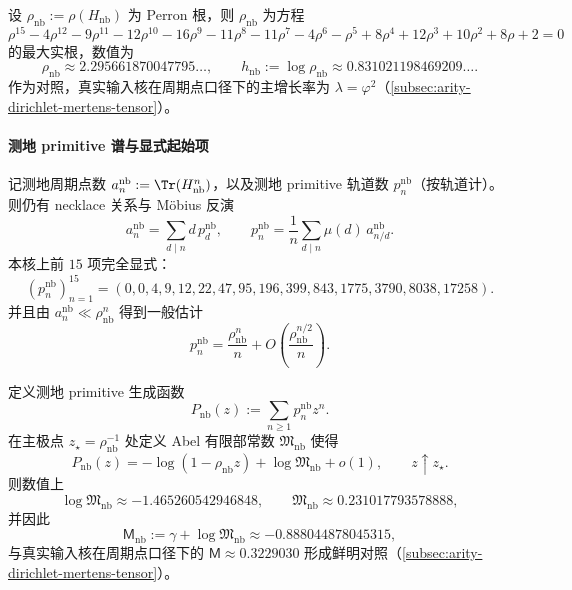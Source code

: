 \begin{corollary}[测地增长率与测地熵]\label{cor:real-input-40-geodesic-entropy}
设 \(\rho_{\mathrm{nb}}:=\rho(H_{\mathrm{nb}})\) 为 Perron 根，则 \(\rho_{\mathrm{nb}}\) 为方程
\[
\rho^{15}-4\rho^{12}-9\rho^{11}-12\rho^{10}-16\rho^{9}-11\rho^{8}-11\rho^{7}-4\rho^{6}-\rho^{5}+8\rho^{4}+12\rho^{3}+10\rho^{2}+8\rho+2=0
\]
的最大实根，数值为
\[
\rho_{\mathrm{nb}}\approx 2.295661870047795\ldots,\qquad
h_{\mathrm{nb}}:=\log\rho_{\mathrm{nb}}\approx 0.831021198469209\ldots.
\]
作为对照，真实输入核在周期点口径下的主增长率为 \(\lambda=\varphi^2\)（\ref{subsec:arity-dirichlet-mertens-tensor}）。
\end{corollary}

\paragraph{测地 primitive 谱与显式起始项}
记测地周期点数 \(a_n^{\mathrm{nb}}:=\Tr(H_{\mathrm{nb}}^n)\)，以及测地 primitive 轨道数 \(p_n^{\mathrm{nb}}\)（按轨道计）。
则仍有 necklace 关系与 Möbius 反演
\[
a_n^{\mathrm{nb}}=\sum_{d\mid n} d\,p_d^{\mathrm{nb}},
\qquad
p_n^{\mathrm{nb}}=\frac1n\sum_{d\mid n}\mu(d)\,a_{n/d}^{\mathrm{nb}}.
\]
本核上前 \(15\) 项完全显式：
\[
(p_n^{\mathrm{nb}})_{n=1}^{15}=(0,0,4,9,12,22,47,95,196,399,843,1775,3790,8038,17258).
\]
并且由 \(a_n^{\mathrm{nb}}\ll \rho_{\mathrm{nb}}^n\) 得到一般估计
\[
p_n^{\mathrm{nb}}=\frac{\rho_{\mathrm{nb}}^n}{n}+O\!\left(\frac{\rho_{\mathrm{nb}}^{n/2}}{n}\right).
\]

\begin{theorem}\label{thm:real-input-40-geodesic-mertens}
定义测地 primitive 生成函数
\[
P_{\mathrm{nb}}(z):=\sum_{n\ge 1}p_n^{\mathrm{nb}}z^n.
\]
在主极点 \(z_\star=\rho_{\mathrm{nb}}^{-1}\) 处定义 Abel 有限部常数 \(\mathfrak{M}_{\mathrm{nb}}\) 使得
\[
P_{\mathrm{nb}}(z)=-\log(1-\rho_{\mathrm{nb}}z)+\log\mathfrak{M}_{\mathrm{nb}}+o(1),
\qquad z\uparrow z_\star.
\]
则数值上
\[
\boxed{
\log\mathfrak{M}_{\mathrm{nb}}\approx -1.465260542946848,\qquad
\mathfrak{M}_{\mathrm{nb}}\approx 0.231017793578888,
}
\]
并因此
\[
\boxed{
\mathsf{M}_{\mathrm{nb}}:=\gamma+\log\mathfrak{M}_{\mathrm{nb}}\approx -0.888044878045315,
}
\]
与真实输入核在周期点口径下的 \(\mathsf{M}\approx 0.3229030\) 形成鲜明对照（\ref{subsec:arity-dirichlet-mertens-tensor}）。
\end{theorem}

